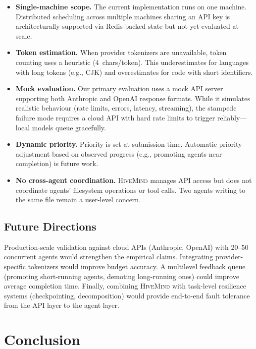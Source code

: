 \documentclass[11pt,twocolumn]{article}
\newcommand{\hm}{\textsc{HiveMind}}
\begin{document}
\begin{itemize}[nosep]
  \item \textbf{Single-machine scope.}  The current
    implementation runs on one machine.  Distributed scheduling
    across multiple machines sharing an API key is architecturally
    supported via Redis-backed state but not yet evaluated at
    scale.
  \item \textbf{Token estimation.}  When provider tokenizers
    are unavailable, token counting uses a heuristic
    (4~chars/token).  This underestimates for languages with
    long tokens (e.g., CJK) and overestimates for code with
    short identifiers.
  \item \textbf{Mock evaluation.}  Our primary evaluation uses
    a mock API server supporting both Anthropic and OpenAI
    response formats.  While it simulates realistic behaviour
    (rate limits, errors, latency, streaming), the stampede
    failure mode requires a cloud API with hard rate limits to
    trigger reliably---local models queue gracefully.
  \item \textbf{Dynamic priority.}  Priority is set at submission
    time.  Automatic priority adjustment based on observed
    progress (e.g., promoting agents near completion) is future
    work.
  \item \textbf{No cross-agent coordination.}  \hm{} manages
    API access but does not coordinate agents' filesystem
    operations or tool calls.  Two agents writing to the same
    file remain a user-level concern.
\end{itemize}

\subsection{Future Directions}

Production-scale validation against cloud APIs (Anthropic,
OpenAI) with 20--50 concurrent agents would strengthen the
empirical claims.  Integrating provider-specific tokenizers
would improve budget accuracy.  A multilevel feedback queue
(promoting short-running agents, demoting long-running ones)
could improve average completion time.  Finally, combining
\hm{} with task-level resilience systems (checkpointing,
decomposition) would provide end-to-end fault tolerance from
the API layer to the agent layer.

\section{Conclusion}
\label{sec:conclusion}
\end{document}
